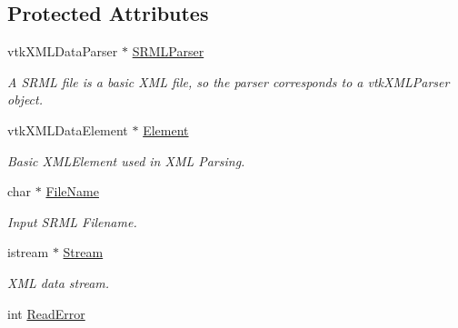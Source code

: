 \subsection*{Protected Attributes}
\begin{DoxyCompactItemize}
\item 
\hypertarget{classvtkSRMLImporter_a65cc2991118b46c1404323568c3677e9}{
vtkXMLDataParser $\ast$ \hyperlink{classvtkSRMLImporter_a65cc2991118b46c1404323568c3677e9}{SRMLParser}}
\label{classvtkSRMLImporter_a65cc2991118b46c1404323568c3677e9}

\begin{DoxyCompactList}\small\item\em A SRML file is a basic XML file, so the parser corresponds to a vtkXMLParser object. \item\end{DoxyCompactList}\item 
\hypertarget{classvtkSRMLImporter_ab2947908aa3b3c13cf939a7f7234ec47}{
vtkXMLDataElement $\ast$ \hyperlink{classvtkSRMLImporter_ab2947908aa3b3c13cf939a7f7234ec47}{Element}}
\label{classvtkSRMLImporter_ab2947908aa3b3c13cf939a7f7234ec47}

\begin{DoxyCompactList}\small\item\em Basic XMLElement used in XML Parsing. \item\end{DoxyCompactList}\item 
\hypertarget{classvtkSRMLImporter_a3fe69d9dfa445f116dc48f677263deb3}{
char $\ast$ \hyperlink{classvtkSRMLImporter_a3fe69d9dfa445f116dc48f677263deb3}{FileName}}
\label{classvtkSRMLImporter_a3fe69d9dfa445f116dc48f677263deb3}

\begin{DoxyCompactList}\small\item\em Input SRML Filename. \item\end{DoxyCompactList}\item 
\hypertarget{classvtkSRMLImporter_a02805ba7383ee6f553ca38c8bf3d9a9c}{
istream $\ast$ \hyperlink{classvtkSRMLImporter_a02805ba7383ee6f553ca38c8bf3d9a9c}{Stream}}
\label{classvtkSRMLImporter_a02805ba7383ee6f553ca38c8bf3d9a9c}

\begin{DoxyCompactList}\small\item\em XML data stream. \item\end{DoxyCompactList}\item 
\hypertarget{classvtkSRMLImporter_ab32c7b873c730d367cbf115a4af0182b}{
int \hyperlink{classvtkSRMLImporter_ab32c7b873c730d367cbf115a4af0182b}{ReadError}}
\label{classvtkSRMLImporter_ab32c7b873c730d367cbf115a4af0182b}


\end{DoxyCompactItemize}
